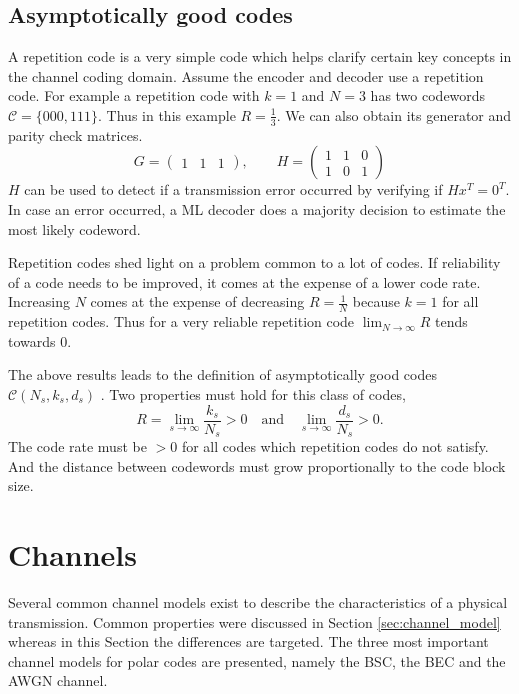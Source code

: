\subsection{Asymptotically good codes}\label{theory:repetition_code}
A repetition code is a very simple code which helps clarify certain key concepts in the channel coding domain.
Assume the encoder and decoder use a repetition code.
For example a repetition code with $k=1$ and $N = 3$ has two codewords $\mathcal{C} = \{000, 111\}$.
Thus in this example $R=\frac{1}{3}$.
We can also obtain its generator and parity check matrices.
\begin{equation}
 G = \begin{pmatrix} 1 & 1 & 1 \end{pmatrix},\qquad H = \begin{pmatrix} 1 & 1 & 0 \\ 1 & 0 & 1 \end{pmatrix}
\end{equation}
$H$ can be used to detect if a transmission error occurred by verifying if $H x^T = 0^T$.
In case an error occurred, a \ac{ML} decoder does a majority decision to estimate the most likely codeword.

Repetition codes shed light on a problem common to a lot of codes.
If reliability of a code needs to be improved, it comes at the expense of a lower code rate.
Increasing $N$ comes at the expense of decreasing $R = \frac{1}{N}$ because $k=1$ for all repetition codes.
Thus for a very reliable repetition code $\lim_{N \rightarrow \infty} R$ tends towards $0$.

The above results leads to the definition of asymptotically good codes $\mathcal{C}(N_s, k_s, d_s)$ \cite{Friedrichs:2010:error-control-coding}.
Two properties must hold for this class of codes,
\begin{equation}
 R = \lim_{s \rightarrow \infty} \frac{k_s}{N_s} > 0 \quad \textrm{and} \quad  \lim_{s \rightarrow \infty} \frac{d_s}{N_s} > 0.
\end{equation}
The code rate must be $>0$ for all codes which repetition codes do not satisfy.
And the distance between codewords must grow proportionally to the code block size.

\section{Channels}\label{theory:channels}
Several common channel models exist to describe the characteristics of a physical transmission.
Common properties were discussed in Section \ref{sec:channel_model} whereas in this Section the differences are targeted.
The three most important channel models for polar codes are presented, namely the \ac{BSC}, the \ac{BEC} and the \ac{AWGN} channel.

